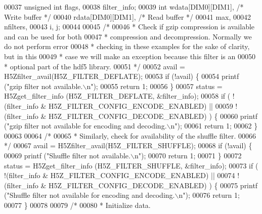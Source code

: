 \begin{DoxyCode}
00037     \textcolor{keywordtype}{unsigned} \textcolor{keywordtype}{int}    flags,
00038                     filter\_info;
00039     \textcolor{keywordtype}{int}             wdata[DIM0][DIM1],          \textcolor{comment}{/* Write buffer */}
00040                     rdata[DIM0][DIM1],          \textcolor{comment}{/* Read buffer */}
00041                     max,
00042                     nfilters,
00043                     i, j;
00044 
00045     \textcolor{comment}{/*}
00046 \textcolor{comment}{     * Check if gzip compression is available and can be used for both}
00047 \textcolor{comment}{     * compression and decompression.  Normally we do not perform error}
00048 \textcolor{comment}{     * checking in these examples for the sake of clarity, but in this}
00049 \textcolor{comment}{     * case we will make an exception because this filter is an}
00050 \textcolor{comment}{     * optional part of the hdf5 library.}
00051 \textcolor{comment}{     */}
00052     avail = H5Zfilter\_avail(H5Z\_FILTER\_DEFLATE);
00053     \textcolor{keywordflow}{if} (!avail) \{
00054         printf (\textcolor{stringliteral}{"gzip filter not available.\(\backslash\)n"});
00055         \textcolor{keywordflow}{return} 1;
00056     \}
00057     status = H5Zget\_filter\_info (H5Z\_FILTER\_DEFLATE, &filter\_info);
00058     \textcolor{keywordflow}{if} ( !(filter\_info & H5Z\_FILTER\_CONFIG\_ENCODE\_ENABLED) ||
00059                 !(filter\_info & H5Z\_FILTER\_CONFIG\_DECODE\_ENABLED) ) \{
00060         printf (\textcolor{stringliteral}{"gzip filter not available for encoding and decoding.\(\backslash\)n"});
00061         \textcolor{keywordflow}{return} 1;
00062     \}
00063 
00064     \textcolor{comment}{/*}
00065 \textcolor{comment}{     * Similarly, check for availability of the shuffle filter.}
00066 \textcolor{comment}{     */}
00067     avail = H5Zfilter\_avail(H5Z\_FILTER\_SHUFFLE);
00068     \textcolor{keywordflow}{if} (!avail) \{
00069         printf (\textcolor{stringliteral}{"Shuffle filter not available.\(\backslash\)n"});
00070         \textcolor{keywordflow}{return} 1;
00071     \}
00072     status = H5Zget\_filter\_info (H5Z\_FILTER\_SHUFFLE, &filter\_info);
00073     \textcolor{keywordflow}{if} ( !(filter\_info & H5Z\_FILTER\_CONFIG\_ENCODE\_ENABLED) ||
00074                 !(filter\_info & H5Z\_FILTER\_CONFIG\_DECODE\_ENABLED) ) \{
00075         printf (\textcolor{stringliteral}{"Shuffle filter not available for encoding and decoding.\(\backslash\)n"});
00076         \textcolor{keywordflow}{return} 1;
00077     \}
00078 
00079     \textcolor{comment}{/*}
00080 \textcolor{comment}{     * Initialize data.}

\end{DoxyCode}
